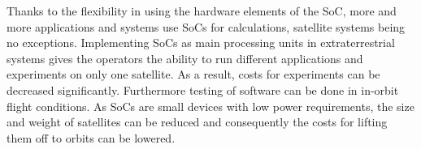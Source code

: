  Thanks to the flexibility in using the hardware elements of the SoC, more and more applications and systems use SoCs for calculations, satellite systems being no exceptions. Implementing SoCs as main processing units in extraterrestrial systems gives the operators the ability to run different applications and experiments on only one satellite. As a result, costs for experiments can be decreased significantly. Furthermore testing of software can be done in in-orbit flight conditions. As SoCs are small devices with low power requirements, the size and weight of satellites can be reduced and consequently the costs for lifting them off to orbits can be lowered.
 